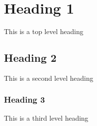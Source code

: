 \documentclass[10pt,a4paper]{article}
\begin{document}
\section{Heading 1}
This is a top level heading

\subsection{Heading 2}
This is a second level heading

\subsubsection{Heading 3}
This is a third level heading
\end{document}
